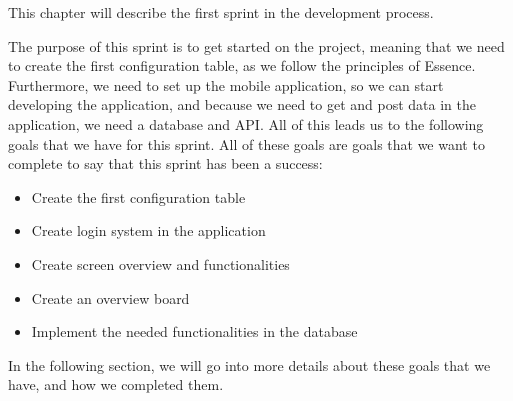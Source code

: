 This chapter will describe the first sprint in the development process.

The purpose of this sprint is to get started on the project, meaning that we need to create the first configuration table, as we follow the principles of Essence.
Furthermore, we need to set up the mobile application, so we can start developing the application, and because we need to get and post data in the application, we need a database and API.
All of this leads us to the following goals that we have for this sprint.
All of these goals are goals that we want to complete to say that this sprint has been a success:

\begin{itemize}
    \item Create the first configuration table 
    \item Create login system in the application
    \item Create screen overview and functionalities
    \item Create an overview board
    \item Implement the needed functionalities in the database
\end{itemize}

In the following section, we will go into more details about these goals that we have, and how we completed them.
